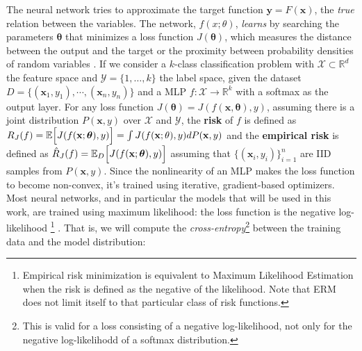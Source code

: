 The neural network tries to approximate the target function $\mathbf{y} = F(\mathbf{x})$, the \textit{true} relation between the variables. The network, $f(x;\theta)$, \textit{learns} by searching the parameters $\boldsymbol{\theta}$ that minimizes a loss function $J(\boldsymbol{\theta})$, which measures the distance between the output and the target or the proximity between probability densities of random variables \cite*{calin2020}. If we consider a $k$-class classification problem with $\mathcal{X} \subset \mathbb{R}^d$ the feature space and $\mathcal{Y} = \{1,\dots, k\}$ the label space, given the dataset $D = \{(\mathbf{x}_1, y_1),\cdots,(\mathbf{x}_n, y_n)\}$ and a MLP $f\colon \mathcal{X} \to \mathbb{R}^k$ with a softmax as the output layer.
For any loss function $J(\boldsymbol{\theta}) = J(f(\mathbf{x}, \boldsymbol{\theta}), y)$, assuming there is a joint distribution $P(\mathbf{x},y)$ over $\mathcal{X}$ and $\mathcal{Y}$, the \textbf{risk} of $f$ is defined as $R_J (f) = \mathbb{E}\Bigl[ J(f(\mathbf{x}; \boldsymbol{\theta}), y) \Bigr] = \int J(f(\mathbf{x}; \theta), y) dP(\mathbf{x}, y)$ and the \textbf{empirical risk} is defined as $\hat{R}_J (f) = \mathbb{E}_D \Bigl[ J(f(\mathbf{x}; \boldsymbol{\theta}), y) \Bigr]$ assuming that $\{(\mathbf{x}_i, y_i)\}_{i=1}^n$ are IID samples from $P(\mathbf{x}, y)$.
Since the nonlinearity of an MLP makes the loss function to become non-convex, it's trained using iterative, gradient-based optimizers. Most neural networks, and in particular the models that will be used in this work, are trained using maximum likelihood: the loss function is the negative log-likelihood \footnote{Empirical risk minimization is equivalent to Maximum Likelihood Estimation when the risk is defined as the negative of the likelihood. Note that ERM does not limit itself to that particular class of risk functions.} \cite{goodfellow2016}. That is, we will compute the \textit{cross-entropy}\footnote{This is valid for a loss consisting of a negative log-likelihood, not only for the negative log-likelihodd of a softmax distribution.} between the training data and the model distribution:


